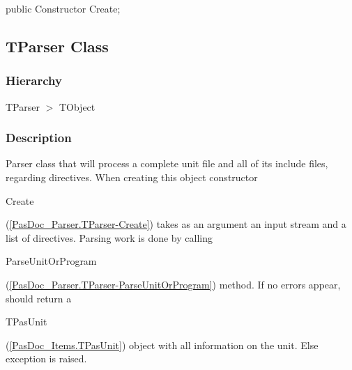 \documentclass{report}
\newif\ifpdf
\begin{document}
\label{PasDoc_Parser.TRawDescriptionInfoList-Create}
\begin{list}{}{
\setlength{\itemindent}{0cm}
\setlength{\listparindent}{0cm}
\setlength{\leftmargin}{\evensidemargin}
\addtolength{\leftmargin}{\tmplength}
\settowidth{\labelsep}{X}
\addtolength{\leftmargin}{\labelsep}
\setlength{\labelwidth}{\tmplength}
}
\item[\textbf{Declaration}\hfill]
\ifpdf
\begin{flushleft}
\fi
\begin{ttfamily}
public Constructor Create;\end{ttfamily}

\ifpdf
\end{flushleft}
\fi

\end{list}
\ifpdf
\subsection*{\large{\textbf{TParser Class}}\normalsize\hspace{1ex}\hrulefill}
\else
\subsection*{TParser Class}
\fi
\label{PasDoc_Parser.TParser}
\subsubsection*{\large{\textbf{Hierarchy}}\normalsize\hspace{1ex}\hfill}
TParser {$>$} TObject
\subsubsection*{\large{\textbf{Description}}\normalsize\hspace{1ex}\hfill}
Parser class that will process a complete unit file and all of its include files, regarding directives. When creating this object constructor \begin{ttfamily}Create\end{ttfamily}(\ref{PasDoc_Parser.TParser-Create}) takes as an argument an input stream and a list of directives. Parsing work is done by calling \begin{ttfamily}ParseUnitOrProgram\end{ttfamily}(\ref{PasDoc_Parser.TParser-ParseUnitOrProgram}) method. If no errors appear, should return a \begin{ttfamily}TPasUnit\end{ttfamily}(\ref{PasDoc_Items.TPasUnit}) object with all information on the unit. Else exception is raised.
\end{document}
